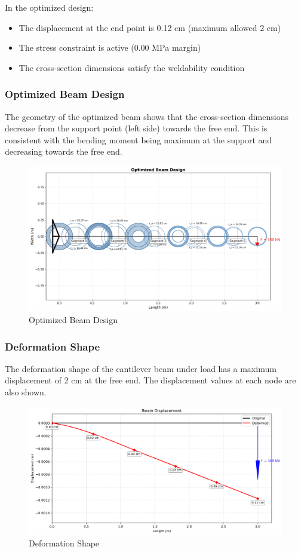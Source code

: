 In the optimized design:
\begin{itemize}
    \item The displacement at the end point is 0.12 cm (maximum allowed 2 cm)
    \item The stress constraint is active (0.00 MPa margin)
    \item The cross-section dimensions satisfy the weldability condition
\end{itemize}

\subsubsection{Optimized Beam Design}
The geometry of the optimized beam shows that the cross-section dimensions decrease from the support point (left side) towards the free end. This is consistent with the bending moment being maximum at the support and decreasing towards the free end.
\begin{figure}[H]
    \centering
    \includegraphics[width=1\textwidth]{weeks_new/imgs/optimized_beam.png}
    \caption{Optimized Beam Design}
    \label{fig:optimized_beam}
\end{figure}

\subsubsection{Deformation Shape}
The deformation shape of the cantilever beam under load has a maximum displacement of 2 cm at the free end. The displacement values at each node are also shown.

\begin{figure}[H]
    \centering
    \includegraphics[width=1\textwidth]{weeks_new/imgs/deformed_beam.png}
    \caption{Deformation Shape}
    \label{fig:deformed_beam}
\end{figure}

